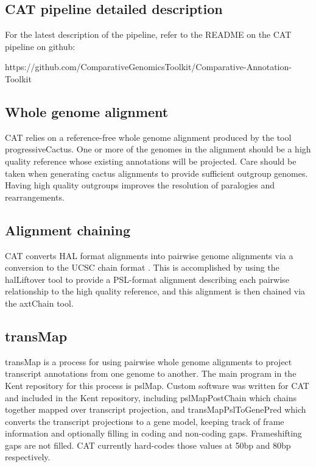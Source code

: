 \documentclass[fleqn,10pt]{wlscirep}
\begin{document}
\subsection*{CAT pipeline detailed description}
For the latest description of the pipeline, refer to the README on the CAT pipeline on github: 

https://github.com/ComparativeGenomicsToolkit/Comparative-Annotation-Toolkit

\subsection*{Whole genome alignment}
	CAT relies on a reference-free whole genome alignment produced by the tool progressiveCactus. One or more of the genomes in the alignment should be a high quality reference whose existing annotations will be projected. Care should be taken when generating cactus alignments to provide sufficient outgroup genomes. Having high quality outgroups improves the resolution of paralogies and rearrangements.

\subsection*{Alignment chaining}
	CAT converts HAL format alignments into pairwise genome alignments via a conversion to the UCSC chain format \cite{kent2003evolution}. This is accomplished by using the halLiftover tool to provide a PSL-format alignment describing each pairwise relationship to the high quality reference, and this alignment is then chained via the axtChain tool. 
    
\subsection*{transMap}
	transMap \cite{stanke2008using,zhu2007comparative} is a process for using pairwise whole genome alignments to project transcript annotations from one genome to another. The main program in the Kent repository for this process is pslMap. Custom software was written for CAT and included in the Kent repository, including pslMapPostChain which chains together mapped over transcript projection, and transMapPslToGenePred which converts the transcript projections to a gene model, keeping track of frame information and optionally filling in coding and non-coding gaps. Frameshifting gaps are not filled. CAT currently hard-codes those values at 50bp and 80bp respectively.
    
\end{document}
